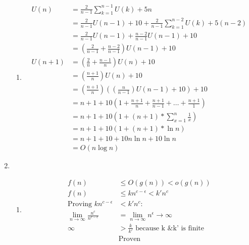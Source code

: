 \documentclass{article}
\begin{document}
\begin{enumerate}
{\begin{enumerate}
{\begin{align*}
						T(n) &= ((2^{\lg 3})^{\lg n})+5n\cdot\frac{\frac{3}{2}^{\lg n} - 1}{\frac{3}{2} - 1}\\
						T(n) &= 2^{\lg n \cdot \lg 3} + 10n \cdot (\frac{3^{\lg n}}{2^{\lg n}} - 1)\\
						T(n) &= n^{\lg 3} + 10n \cdot (\frac{n ^{\lg 3}}{n} - 1)\\
						T(n) &= 11 n^{\lg 3} - 10n\\
						T(n) &= O(n^{\lg 3})
					\end{align*}
				}
				\pagebreak
				\item{
					\begin{align*}
						U(n)&=\frac{2}{n-1}\sum_{k=1}^{n-1}U(k) + 5n\\
						&=\frac{2}{n-1}U(n-1) + 10 + \frac{2}{n-1}\sum_{k=1}^{n-2}U(k) + 5(n-2)\\
						&=\frac{2}{n-1}U(n-1) + \frac{n-2}{n-1}U(n-1) + 10\\
						&=(\frac{2}{n-1} + \frac{n-2}{n-1})U(n-1) + 10\\
						U(n+1)&=(\frac{2}{n} + \frac{n-1}{n})U(n) + 10\\
						&=(\frac{n+1}{n})U(n) + 10\\
						&=(\frac{n+1}{n})((\frac{n}{n-1})U(n-1) +10)+10\\
						&=n + 1 + 10(1 + \frac{n+1}{n}+\frac{n+1}{n-1}+\dots+\frac{n+1}{1})\\
						&=n+1+10(1+(n+1)*\sum_{x=1}^{n}\frac{1}{x})\\
						&=n+1+10(1+(n+1)*\ln n)\\
						&=n+1 + 10 + 10n\ln n + 10\ln n\\
						&=O(n \log n)
					\end{align*}
				}
			\end{enumerate}
		}
		\pagebreak
		\item {
			\begin{enumerate}
				\item {
					\begin{align*}
						f(n) &\leq O(g(n)) < o(g(n))\\
						f(n) &\leq k n^{c-\epsilon} < k'n^c\\
						\text{Proving }kn^{c-\epsilon} &< k'n^c:\\
						\lim_{n\to\infty}\frac{n^c}{n^{c-\epsilon}}&=\lim_{n\to\infty}n^\epsilon\to\infty\\
						\infty &> \frac{k}{k'} \text{ because k \& k' is finite}\\
						&\text{Proven}
					\end{align*}
}
\end{enumerate}}
\end{enumerate}
\end{document}
